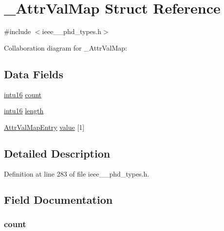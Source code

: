 \hypertarget{struct___attr_val_map}{}\section{\+\_\+\+Attr\+Val\+Map Struct Reference}
\label{struct___attr_val_map}


{\ttfamily \#include $<$ieee\+\_\+\_\+phd\+\_\+types.\+h$>$}



Collaboration diagram for \+\_\+\+Attr\+Val\+Map\+:
\subsection*{Data Fields}
\begin{DoxyCompactItemize}
\item 
\hyperlink{ieee__11073__phd__types_8h_a3561595d2aa7416532e1c9910abd076d}{intu16} \hyperlink{struct___attr_val_map_abf6db060ae8e224764b0f867fb135ecd}{count}
\item 
\hyperlink{ieee__11073__phd__types_8h_a3561595d2aa7416532e1c9910abd076d}{intu16} \hyperlink{struct___attr_val_map_a3743679e4ff85e3e1b3fc2e59973fbb3}{length}
\item 
\hyperlink{ieee__11073__phd__types_8h_a5e7af6f3b5441b4d2955b56dd38eec41}{Attr\+Val\+Map\+Entry} \hyperlink{struct___attr_val_map_ae441aff11c5753866353206b99d69a28}{value} \mbox{[}1\mbox{]}
\end{DoxyCompactItemize}


\subsection{Detailed Description}


Definition at line 283 of file ieee\+\_\+\_\+phd\+\_\+types.\+h.



\subsection{Field Documentation}
\hypertarget{struct___attr_val_map_abf6db060ae8e224764b0f867fb135ecd}{}
\subsubsection[{count}]{ count}\label{struct___attr_val_map_abf6db060ae8e224764b0f867fb135ecd}



